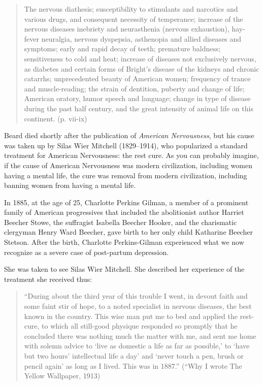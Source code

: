 \begin{quote}

The nervous diathesis; susceptibility to stimulants and narcotics and various drugs, and consequent necessity of temperance; increase of the nervous diseases inebriety and neurasthenia (nervous exhaustion), hay-fever neuralgia, nervous dyspepsia, asthenopia and allied diseases and symptoms; early and rapid decay of teeth; premature baldness; sensitiveness to cold and heat; increase of diseases not exclusively nervous, as diabetes and certain forms of Bright's disease of the kidneys and chronic catarrhs; unprecedented beauty of American women; frequency of trance and muscle-reading; the strain of dentition, puberty and change of life; American oratory, humor speech and language; change in type of disease during the past half century, and the great intensity of animal life on this continent. (p. vii-ix)
\end{quote}

Beard died shortly after the publication of \emph{American Nervousness}, but his cause was taken up by Silas Wier Mitchell (1829--1914), who popularized a standard treatment for American Nervousness: the rest cure. As you can probably imagine, if the cause of American Nervousness was modern civilization, including women having a mental life, the cure was removal from modern civilization, including banning women from having a mental life.

In 1885, at the age of 25, Charlotte Perkins Gilman, a member of a prominent family of American progressives that included the abolitionist author Harriet Beecher Stowe, the suffragist Isabella Beecher Hooker, and the charismatic clergyman Henry Ward Beecher, gave birth to her only child Katharine Beecher Stetson. After the birth, Charlotte Perkins-Gilman experienced what we now recognize as a severe case of post-partum depression.

She was taken to see Silas Wier Mitchell. She described her experience of the treatment she received thus:

\begin{quote}

“During about the third year of this trouble I went, in devout faith and some faint stir of hope, to a noted specialist in nervous diseases, the best known in the country. This wise man put me to bed and applied the rest-cure, to which all still-good physique responded so promptly that he concluded there was nothing much the matter with me, and sent me home with solemn advice to `live as domestic a life as far as possible,' to `have but two hours' intellectual life a day' and `never touch a pen, brush or pencil again' as long as I lived. This was in 1887.” (“Why I wrote The Yellow Wallpaper, 1913)
\end{quote}

